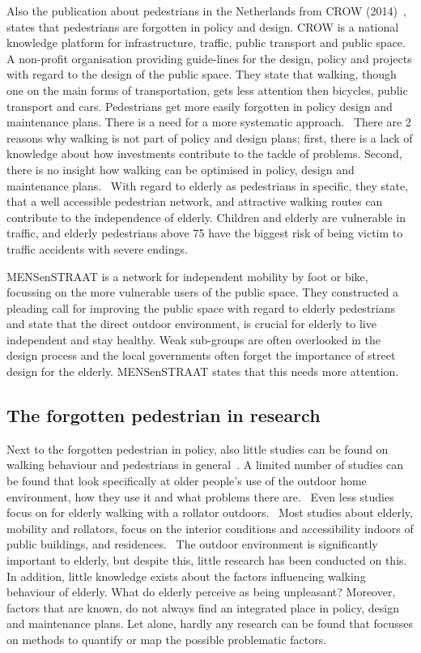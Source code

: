 Also the publication about pedestrians in the Netherlands from CROW (2014)~\cite{Crow2014}, states that pedestrians are forgotten in policy and design. CROW is a national knowledge platform for infrastructure, traffic, public transport and public space. A non-profit organisation providing guide-lines for the design, policy and projects with regard to the design of the public space. They state that walking, though one on the main forms of transportation, gets less attention then bicycles, public transport and cars. Pedestrians get more easily forgotten in policy design and maintenance plans. There is a need for a more systematic approach.~\cite{Crow2014} There are 2 reasons why walking is not part of policy and design plans; first, there is a lack of knowledge about how investments contribute to the tackle of problems. Second, there is no insight how walking can be optimised in policy, design and maintenance plans.~\cite{Crow2014}
With regard to elderly as pedestrians in specific, they state, that a well accessible pedestrian network, and attractive walking routes can contribute to the independence of elderly. Children and elderly are vulnerable in traffic, and elderly pedestrians above 75 have the biggest risk of being victim to traffic accidents with severe endings.~\cite{Crow2014}

MENSenSTRAAT is a network for independent mobility by foot or bike, focussing on the more vulnerable users of the public space. They constructed a pleading call for improving the public space with regard to elderly pedestrians and state that the direct outdoor environment, is crucial for elderly to live independent and stay healthy. Weak sub-groups are often overlooked in the design process and the local governments often forget the importance of street design for the elderly. MENSenSTRAAT states that this needs more attention.~\cite{MENSenSTRAAT2014} 

\subsection{The forgotten pedestrian in research}
Next to the forgotten pedestrian in policy, also little studies can be found on walking behaviour and pedestrians in general~\cite{Vine2012}. A limited number of studies can be found that look specifically at older people's use of the outdoor home environment, how they use it and what problems there are.~\cite{Phillips2013, Stahl2008} Even less studies focus on for elderly walking with a rollator outdoors.~\cite{Stahl2008, Stahl2013, Phillips2013} Most studies about elderly, mobility and rollators, focus on the interior conditions and accessibility indoors of public buildings, and residences.~\cite{Crow2014, Sauter2010, Verschuur2013} The outdoor environment is significantly important to elderly, but despite this, little research has been conducted on this.~\cite{Stahl2008} In addition, little knowledge exists about the factors influencing walking behaviour of elderly. What do elderly perceive as being unpleasant? Moreover, factors that are known, do not always find an integrated place in policy, design and maintenance plans. Let alone, hardly any research can be found that focusses on methods to quantify or map the possible problematic factors. 

